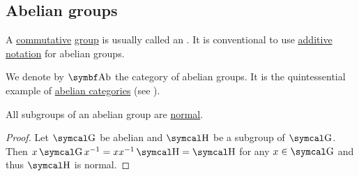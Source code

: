\subsection{Abelian groups}\label{subsec:abelian_groups}

\begin{definition}\label{def:abelian_group}
  A \hyperref[def:magma/commutative]{commutative} \hyperref[def:group]{group} is usually called an . It is conventional to use \hyperref[remark:additive_magma]{additive notation} for abelian groups.

  We denote by \( \Cat{Ab} \) the category of abelian groups. It is the quintessential example of \hyperref[def:abelian_category]{abelian categories} (see ).
\end{definition}

\begin{proposition}\label{thm:abelian_normal_subgroups}
  All subgroups of an abelian group are \hyperref[def:normal_subgroups]{normal}.
\end{proposition}
\begin{proof}
  Let \( \CG \) be abelian and \( \CH \) be a subgroup of \( \CG \). Then \( x \CG x^{-1} = xx^{-1} \CH = \CH \) for any \( x \in \CG \) and thus \( \CH \) is normal.
\end{proof}

